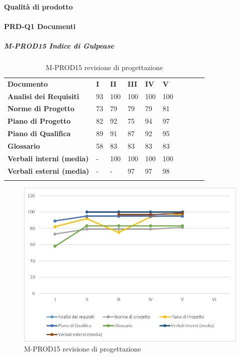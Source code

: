 \paragraph{Qualità di prodotto}
\paragraph*{PRD-Q1 Documenti}
\subparagraph{M-PROD15 Indice di Gulpease}\mbox{}
\begin{longtable} {						
		>{}p{50mm}  		
		>{}p{8mm}		
		>{}p{8mm}		
		>{}p{8mm}		
		>{}p{8mm}		
		>{}p{8mm}		
		>{}p{8mm}
		>{}p{8mm}
		>{}p{8mm}
		>{}p{8mm}				
	}			
	\rowcolor{gray!50}
	\textbf{Documento} & \textbf{I} & \textbf{II} & \textbf{III} & \textbf{IV} & \textbf{V} \TBstrut \\ [2mm]
	\textbf{Analisi dei Requisiti} & 93 & 100 & 100 & 100 & 100 \TBstrut \\ [2mm]
	\textbf{Norme di Progetto} & 73 & 79 & 79 & 79 & 81 \TBstrut \\ [2mm]
	\textbf{Piano di Progetto} & 82 & 92 & 75 & 94 & 97 \TBstrut \\ [2mm]
	\textbf{Piano di Qualifica} & 89 & 91 & 87 & 92 & 95 \TBstrut \\ [2mm]
	\textbf{Glossario} & 58 & 83 & 83 & 83 & 83 \TBstrut \\ [2mm]
	\textbf{Verbali interni (media)} & - & 100 & 100 & 100 & 100 \TBstrut \\ [2mm]
	\textbf{Verbali esterni (media)} & - & - & 97 & 97 & 98 \TBstrut \\ [2mm]
	\rowcolor{white}
	\caption{M-PROD15 revisione di progettazione\glo}
\end{longtable}
\begin{figure}[H] 	
	\includegraphics[width=\linewidth]{./img/grafici/RP18.png}	
	\caption{M-PROD15 revisione di progettazione\glo}	
\end{figure}
